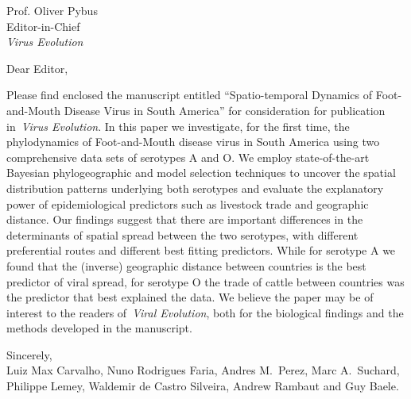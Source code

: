 \documentclass[standard, 
               backaddress=off, 
               foldmarks=false, 
               enlargefirstpage,
               pagenumber=off,
               parskip=half
               ]{scrlttr2}
\def\title{Spatio-temporal Dynamics of Foot-and-Mouth Disease Virus in South America}
\begin{document}

\begin{letter}{%
    Prof. Oliver Pybus \\%
    Editor-in-Chief\\%
    \emph{Virus Evolution}
}

\opening{Dear Editor,}

Please find enclosed the manuscript entitled “\title” for consideration for publication in~\emph{Virus Evolution}.
In this paper we investigate, for the first time, the phylodynamics of Foot-and-Mouth disease virus in South America using two comprehensive data sets of serotypes A and O.
We employ state-of-the-art Bayesian phylogeographic and model selection techniques to uncover the spatial distribution patterns underlying both serotypes and evaluate the explanatory power of epidemiological predictors such as livestock trade and geographic distance.
Our findings suggest that there are important differences in the determinants of spatial spread between the two serotypes, with different preferential routes and different best fitting predictors.
While for serotype A we found that the (inverse) geographic distance between countries is the best predictor of viral spread, for serotype O the trade of cattle between countries was the predictor that best explained the data.
We believe the paper may be of interest to the readers of~\emph{Viral Evolution}, both for the biological findings and the methods developed in the manuscript.

\vspace{0.1cm}
Sincerely, \\
Luiz Max Carvalho, 
Nuno Rodrigues Faria, 
Andres M.~Perez, 
Marc A.~Suchard, 
Philippe Lemey, 
Waldemir de Castro Silveira, 
Andrew Rambaut
and Guy Baele.

\end{letter}
\end{document}
